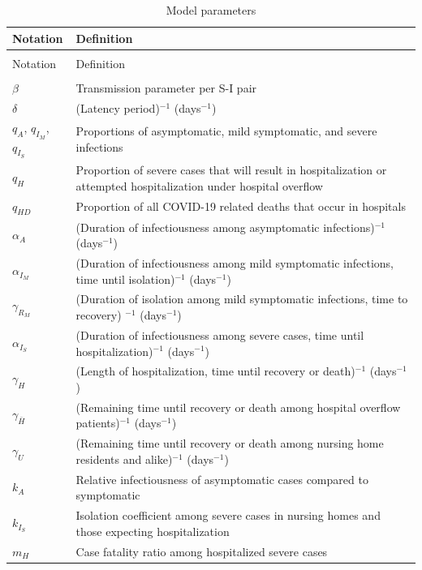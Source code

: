 \documentclass[11pt]{article}
\begin{document}
\begin{spacing}{0.9}
\begin{longtable}[H] {p{} p{} }
	\caption{Model parameters} \\
	Notation & Definition \\[0.5em] \hline
	{} & {} \\
	\endfirsthead
	Notation & Definition  \\[0.5em] \hline
	\endhead
	{} & {}  \\[-1em]
	$\beta$ & Transmission parameter per S-I pair \\[0.5em]
	$\delta$ & (Latency period)$^{-1}$ (days$^{-1}$) \\[0.5em]
	$q_A$, $q_{I_M}$, $q_{I_S}$  & Proportions of asymptomatic, mild symptomatic, and severe infections \\[0.5em]
	$q_H$ & Proportion of severe cases that will result in hospitalization or attempted hospitalization under hospital overflow \\ [0.5em]
	$q_{HD}$ & Proportion of all COVID-19 related deaths that occur in hospitals \\ [0.5em]
	$\alpha_A$ & (Duration of infectiousness among asymptomatic infections)$^{-1}$ (days$^{-1}$) \\[0.5em]	
	$\alpha_{I_M}$ & (Duration of infectiousness among mild symptomatic infections, time until isolation)$^{-1}$ (days$^{-1}$) \\[0.5em]
	$\gamma_{R_M}$ & (Duration of isolation among mild symptomatic infections, time to recovery)	$^{-1}$ (days$^{-1}$) \\[0.5em]
	$\alpha_{I_S}$ & (Duration of infectiousness among severe cases, time until hospitalization)$^{-1}$ (days$^{-1}$) \\[0.5em]	
	$\gamma_{H}$ & (Length of hospitalization, time until recovery or death)$^{-1}$ (days$^{-1}$) \\[0.5em]
	$\gamma_{\bar{H}}$ & (Remaining time until recovery or death among hospital overflow patients)$^{-1}$ (days$^{-1}$) \\[0.5em]
	$\gamma_{U}$ & (Remaining time until recovery or death among nursing home residents and alike)$^{-1}$ (days$^{-1}$) \\[0.5em]
	$k_A$ & Relative infectiousness of asymptomatic cases compared to symptomatic \\[0.5em]
	$k_{I_S}$ & Isolation coefficient among severe cases in nursing homes and those expecting hospitalization \\[0.5em]
	$m_H$ & Case fatality ratio among hospitalized severe cases \\[0.5em]

\end{longtable}
\end{spacing}
\end{document}
